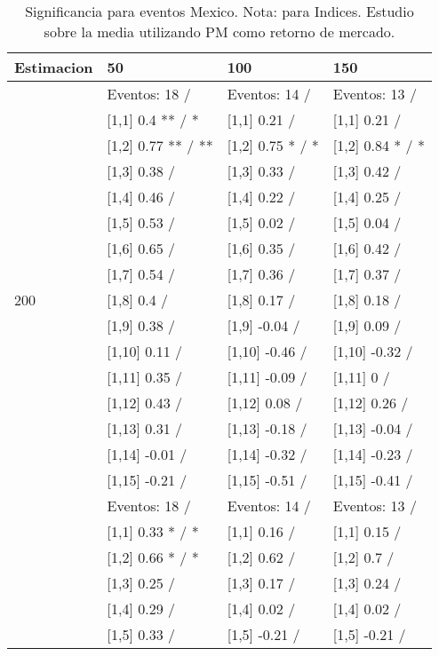 \begin{table}

\caption{Significancia para eventos Mexico. Nota: para Indices. Estudio sobre la media utilizando PM como retorno de mercado.}
\centering
\begin{tabular}[t]{llll}
\toprule
Estimacion & 50 & 100 & 150\\
\midrule
 & Eventos:  18 / & Eventos:  14 / & Eventos:  13 /\\
 & {}[1,1] 0.4 ** / * & {}[1,1] 0.21  / & {}[1,1] 0.21  /\\
 & {}[1,2] 0.77 ** / ** & {}[1,2] 0.75 * / * & {}[1,2] 0.84 * / *\\
 & {}[1,3] 0.38  / & {}[1,3] 0.33  / & {}[1,3] 0.42  /\\
 & {}[1,4] 0.46  / & {}[1,4] 0.22  / & {}[1,4] 0.25  /\\
\addlinespace
 & {}[1,5] 0.53  / & {}[1,5] 0.02  / & {}[1,5] 0.04  /\\
 & {}[1,6] 0.65  / & {}[1,6] 0.35  / & {}[1,6] 0.42  /\\
 & {}[1,7] 0.54  / & {}[1,7] 0.36  / & {}[1,7] 0.37  /\\
200 & {}[1,8] 0.4  / & {}[1,8] 0.17  / & {}[1,8] 0.18  /\\
 & {}[1,9] 0.38  / & {}[1,9] -0.04  / & {}[1,9] 0.09  /\\
\addlinespace
 & {}[1,10] 0.11  / & {}[1,10] -0.46  / & {}[1,10] -0.32  /\\
 & {}[1,11] 0.35  / & {}[1,11] -0.09  / & {}[1,11] 0  /\\
 & {}[1,12] 0.43  / & {}[1,12] 0.08  / & {}[1,12] 0.26  /\\
 & {}[1,13] 0.31  / & {}[1,13] -0.18  / & {}[1,13] -0.04  /\\
 & {}[1,14] -0.01  / & {}[1,14] -0.32  / & {}[1,14] -0.23  /\\
\addlinespace
 & {}[1,15] -0.21  / & {}[1,15] -0.51  / & {}[1,15] -0.41  /\\
 & Eventos:  18 / & Eventos:  14 / & Eventos:  13 /\\
 & {}[1,1] 0.33 * / * & {}[1,1] 0.16  / & {}[1,1] 0.15  /\\
 & {}[1,2] 0.66 * / * & {}[1,2] 0.62  / & {}[1,2] 0.7  /\\
 & {}[1,3] 0.25  / & {}[1,3] 0.17  / & {}[1,3] 0.24  /\\
\addlinespace
 & {}[1,4] 0.29  / & {}[1,4] 0.02  / & {}[1,4] 0.02  /\\
 & {}[1,5] 0.33  / & {}[1,5] -0.21  / & {}[1,5] -0.21  /\\

\end{tabular}
\end{table}
